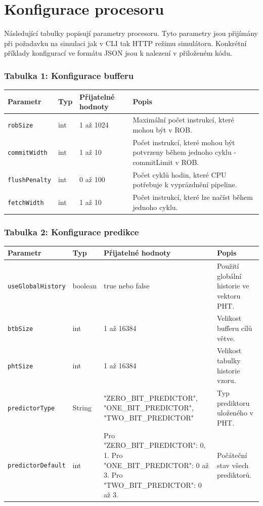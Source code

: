 \chapter{Konfigurace procesoru}
\label{cpuConfigAppendice}

Následující tabulky popisují parametry procesoru.
Tyto parametry jsou přijímány při požadavku na simulaci jak v CLI tak HTTP režimu simulátoru.
Konkrétní příklady konfigurací ve formátu JSON jsou k nalezení v přiloženém kódu.

\subsection*{Tabulka 1: Konfigurace bufferu}

\begin{tabular}{|l|l|l|p{7cm}|}
\hline
Parametr & Typ & Přijatelné hodnoty & Popis \\
\hline
\texttt{robSize} & int & 1 až 1024 & Maximální počet instrukcí, které mohou být v ROB. \\
\texttt{commitWidth} & int & 1 až 10 & Počet instrukcí, které mohou být potvrzeny během jednoho cyklu - commitLimit v ROB. \\
\texttt{flushPenalty} & int & 0 až 100 & Počet cyklů hodin, které CPU potřebuje k vyprázdnění pipeline. \\
\texttt{fetchWidth} & int & 1 až 10 & Počet instrukcí, které lze načíst během jednoho cyklu. \\
\hline
\end{tabular}

\subsection*{Tabulka 2: Konfigurace predikce}

\begin{tabular}{|l|l|p{5.6cm}|p{3cm}|}
\hline
Parametr & Typ & Přijatelné hodnoty & Popis \\
\hline
\texttt{useGlobalHistory} & boolean & true nebo false & Použití globální historie ve vektoru PHT. \\
\texttt{btbSize} & int & 1 až 16384 & Velikost bufferu cílů větve. \\
\texttt{phtSize} & int & 1 až 16384 & Velikost tabulky historie vzoru. \\
\texttt{predictorType} & String & "ZERO\_BIT\_PREDICTOR", "ONE\_BIT\_PREDICTOR", "TWO\_BIT\_PREDICTOR" & Typ prediktoru uloženého v PHT. \\
\texttt{predictorDefault} & int & Pro "ZERO\_BIT\_PREDICTOR": 0, 1. Pro "ONE\_BIT\_PREDICTOR": 0 až 3. Pro "TWO\_BIT\_PREDICTOR": 0 až 3. & Počáteční stav všech prediktorů. \\
\hline
\end{tabular}

